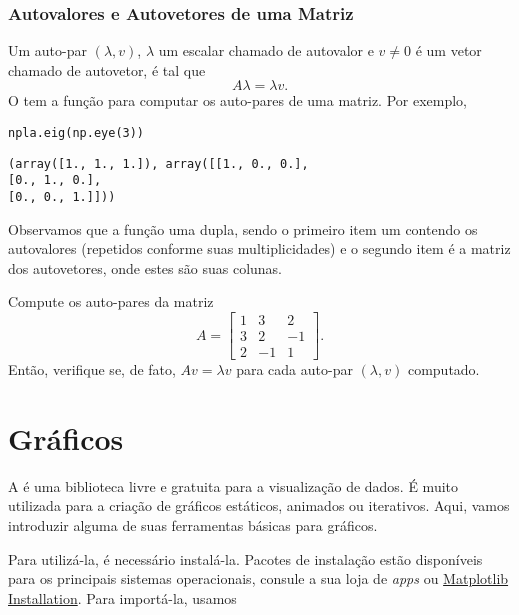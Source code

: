 \documentclass[12pt]{article}
\begin{document}
\subsubsection{Autovalores e Autovetores de uma Matriz}

Um auto-par $(\lambda, v)$, $\lambda$ um escalar chamado de autovalor e $v\neq 0$ é um vetor chamado de autovetor, é tal que
\begin{equation}
  A\lambda = \lambda v.
\end{equation}
O {\PYTHONnumpy} tem a função {\PYTHONnumpyDOTlinalgDOTeig} para computar os auto-pares de uma matriz. Por exemplo,

\begin{lstlisting}
npla.eig(np.eye(3))
\end{lstlisting}

\begin{verbatim}
(array([1., 1., 1.]), array([[1., 0., 0.],
[0., 1., 0.],
[0., 0., 1.]]))
\end{verbatim}

Observamos que a função uma dupla, sendo o primeiro item um {\PYTHONnumpyDOTarray} contendo os autovalores (repetidos conforme suas multiplicidades) e o segundo item é a matriz dos autovetores, onde estes são suas colunas.

\begin{exr}
  Compute os auto-pares da matriz
  \begin{equation}
    A =
    \begin{bmatrix}
      1 & 3 & 2\\
      3 & 2 & -1\\
      2 & -1 & 1
    \end{bmatrix}.
  \end{equation}
  Então, verifique se, de fato, $Av = \lambda v$ para cada auto-par $(\lambda, v)$ computado.
\end{exr}

\section{Gráficos}\label{sec_graf}

A {\PYTHONmatplotlib} é uma biblioteca {\python} livre e gratuita para a visualização de dados. É muito utilizada para a criação de gráficos estáticos, animados ou iterativos. Aqui, vamos introduzir alguma de suas ferramentas básicas para gráficos.

Para utilizá-la, é necessário instalá-la. Pacotes de instalação estão disponíveis para os principais sistemas operacionais, consule a sua loja de {\it apps} ou \href{https://matplotlib.org/stable/users/installing.html}{Matplotlib Installation}. Para importá-la, usamos
\end{document}
